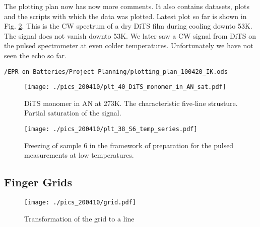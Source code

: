 \documentclass[12pt,a4paper]{report}
\begin{document}
The plotting plan now has now more comments. It also contains datasets, plots and the scripts with which the data was plotted. Latest plot so far is shown in Fig. \ref{fig:dits_temps}. This is the CW spectrum of a dry DiTS film during cooling downto 53K. The signal does not vanish downto 53K. We later saw a CW signal from DiTS on the pulsed spectrometer at even colder temperatures. Unfortunately we have not seen the echo so far.\\
\begin{verbatim}/EPR on Batteries/Project Planning/plotting_plan_100420_IK.ods
\end{verbatim}

\begin{figure} [!ht]

\begin{center}
       \texttt{[image: ./pics\_200410/plt\_40\_DiTS\_monomer\_in\_AN\_sat.pdf]}
       \end{center}
\caption{DiTS monomer in AN at 273K. The characteristic five-line strusture. Partial saturation of the signal.}
     \label{fig:dits_mono}
\end{figure}

\begin{figure} [!ht]

\begin{center}
       \texttt{[image: ./pics\_200410/plt\_38\_S6\_temp\_series.pdf]}
       \end{center}
\caption{Freezing of sample 6 in the framework of preparation for the pulsed measurements at low temperatures. }
     \label{fig:dits_temps}
\end{figure}

\subsection{Finger Grids}

\begin{figure} [!ht]
\begin{center}
       \texttt{[image: ./pics\_200410/grid.pdf]}
       \end{center}
\caption{Transformation of the grid to a line}
     \label{fig:grid}
\end{figure}
\end{document}
